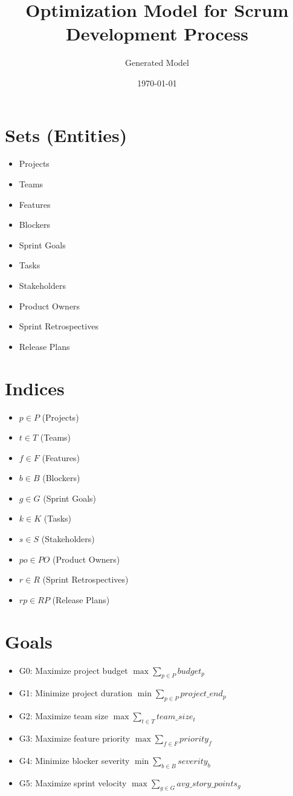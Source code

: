 \documentclass{article}
\title{Optimization Model for Scrum Development Process}
\author{Generated Model}
\date{\today}
\begin{document}
\maketitle
\tableofcontents

\section{Sets (Entities)}
\begin{itemize}
    \item Projects
    \item Teams
    \item Features
    \item Blockers
    \item Sprint Goals
    \item Tasks
    \item Stakeholders
    \item Product Owners
    \item Sprint Retrospectives
    \item Release Plans
\end{itemize}

\section{Indices}
\begin{itemize}
    \item $p \in P$ (Projects)
    \item $t \in T$ (Teams)
    \item $f \in F$ (Features)
    \item $b \in B$ (Blockers)
    \item $g \in G$ (Sprint Goals)
    \item $k \in K$ (Tasks)
    \item $s \in S$ (Stakeholders)
    \item $po \in PO$ (Product Owners)
    \item $r \in R$ (Sprint Retrospectives)
    \item $rp \in RP$ (Release Plans)
\end{itemize}

\section{Goals}
\begin{itemize}
    \item G0: Maximize project budget $\max \sum_{p \in P} budget_p$
    \item G1: Minimize project duration $\min \sum_{p \in P} project\_end_p$
    \item G2: Maximize team size $\max \sum_{t \in T} team\_size_t$
    \item G3: Maximize feature priority $\max \sum_{f \in F} priority_f$
    \item G4: Minimize blocker severity $\min \sum_{b \in B} severity_b$
    \item G5: Maximize sprint velocity $\max \sum_{g \in G} avg\_story\_points_g$
\end{itemize}
\end{document}
